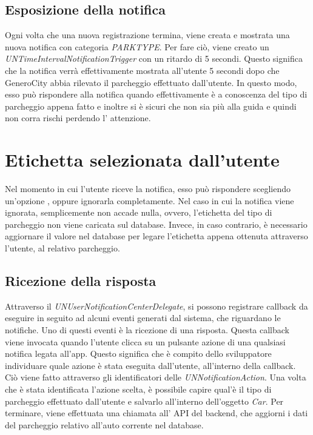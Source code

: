 \subsection{Esposizione della notifica}

Ogni volta che una nuova registrazione termina, viene creata e mostrata una nuova notifica
con categoria \emph{PARKTYPE}. Per fare ciò, viene creato un
\emph{UNTimeIntervalNotificationTrigger} con un ritardo di 5 secondi. Questo significa che
la notifica verrà effettivamente mostrata all'utente 5 secondi dopo che GeneroCity abbia
rilevato il parcheggio effettuato dall'utente. In questo modo, esso può rispondere alla
notifica quando effettivamente è a conoscenza del tipo di parcheggio appena fatto e
inoltre si è sicuri che non sia più alla guida e quindi non corra rischi perdendo l'
attenzione. %

\section{Etichetta selezionata dall'utente}

Nel momento in cui l'utente riceve la notifica, esso può rispondere scegliendo un'opzione
\cite{options_notification},
oppure ignorarla completamente. Nel caso in cui la notifica viene ignorata, semplicemente 
non accade nulla, ovvero, l'etichetta del tipo di parcheggio non viene caricata sul
database. Invece, in caso contrario, è necessario aggiornare il valore nel database per 
legare l'etichetta appena ottenuta attraverso l'utente, al relativo parcheggio.

\subsection{Ricezione della risposta}

Attraverso il \emph{UNUserNotificationCenterDelegate}, si possono registrare callback 
da eseguire in seguito ad alcuni eventi generati dal sistema, che riguardano le notifiche.
Uno di questi eventi è la ricezione di una risposta. Questa callback viene invocata quando
l'utente clicca su un pulsante azione di una qualsiasi notifica legata all'app.
Questo significa che è compito dello sviluppatore individuare quale azione è stata eseguita
dall'utente, all'interno della callback. Ciò viene fatto attraverso gli identificatori
delle \emph{UNNotificationAction}. Una volta che è stata identificata l'azione scelta,
è possibile capire qual'è il tipo di parcheggio effettuato dall'utente e salvarlo
all'interno dell'oggetto \emph{Car}. Per terminare, viene effettuata una chiamata all'
API del backend, che aggiorni i dati del parcheggio relativo all'auto corrente
nel database.



